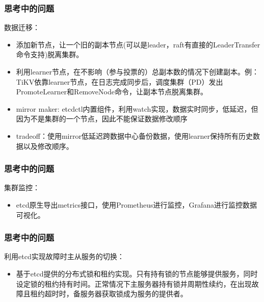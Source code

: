 \documentclass{beamer}
\begin{document}



%
%



%
%

\begin{frame}
\frametitle{思考中的问题}
    数据迁移：
    \begin{itemize}
        \item 添加新节点，让一个旧的副本节点(可以是leader，raft有直接的LeaderTransfer命令支持)脱离集群。
        \item 利用learner节点，在不影响（参与投票的）总副本数的情况下创建副本。例：TiKV依靠learner节点，在日志完成同步后，调度集群（PD）发出PromoteLearner和RemoveNode命令，让副本节点脱离集群。
        \item mirror maker: etcdctl内置组件，利用watch实现，数据实时同步，低延迟，但因为不是集群的一个节点，因此不能保证数据修改顺序
        \item \alert{tradeoff}：使用mirror低延迟跨数据中心备份数据，使用learner保持所有历史数据以及修改顺序。
    \end{itemize}
\end{frame}

\begin{frame}
\frametitle{思考中的问题}
    集群监控：
    \begin{itemize}
        \item etcd原生导出metrics接口，使用Prometheus进行监控，Grafana进行监控数据可视化。
    \end{itemize}
\end{frame}

\begin{frame}
\frametitle{思考中的问题}
    利用etcd实现故障时主从服务的切换：
    \begin{itemize}
        \item 基于etcd提供的分布式锁和租约实现。只有持有锁的节点能够提供服务，同时设定锁的租约持有时间。正常情况下主服务器持有锁并周期性续约，在出现故障且租约超时时，备服务器获取锁成为服务的提供者。
    \end{itemize}
\end{frame}

%
%
\end{document}
